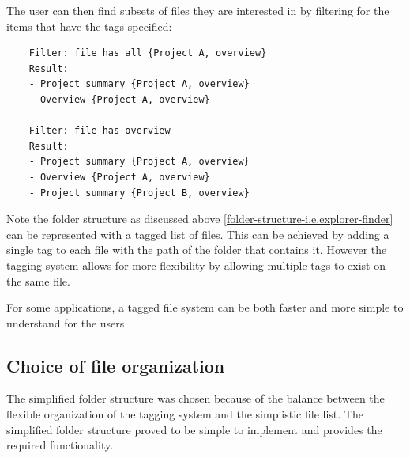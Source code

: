 The user can then find subsets of files they are interested in by
filtering for the items that have the tags specified:

\begin{verbatim}
    Filter: file has all {Project A, overview}
    Result:
    - Project summary {Project A, overview}
    - Overview {Project A, overview}

    Filter: file has overview
    Result:
    - Project summary {Project A, overview}
    - Overview {Project A, overview}
    - Project summary {Project B, overview}
\end{verbatim}

Note the folder structure as discussed above
\ref{folder-structure-i.e.explorer-finder} can be represented with a tagged list
of files. This can be achieved by adding a single tag to each file with the path
of the folder that contains it. However the tagging system allows for more
flexibility by allowing multiple tags to exist on the same file.

For some applications, a tagged file system can be both faster and more simple
to understand for the users\cite{ASI:ASI22906}

\subsection{Choice of file organization}\label{choice-of-file-organization}

The simplified folder structure was chosen because of the balance
between the flexible organization of the tagging system and the
simplistic file list. The simplified folder structure proved to be
simple to implement and provides the required functionality.


